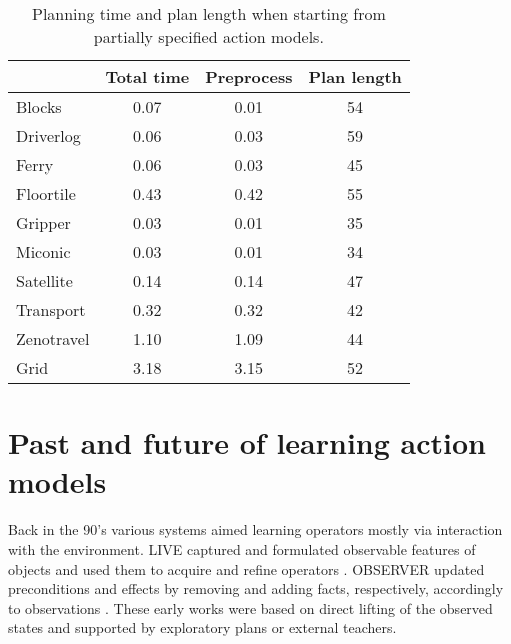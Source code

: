 \documentclass[letterpaper]{article} %
\newcommand{\strips}{\textsc{Strips}}     %
\begin{document}
\begin{table}
\begin{footnotesize}
	\begin{center}
		\begin{tabular}{l|c|c|c|}			
			 & Total time & Preprocess & Plan length  \\
			\hline
			Blocks & 0.07 & 0.01 & 54  \\
			Driverlog & 0.06 & 0.03 & 59 \\
			Ferry & 0.06 & 0.03 & 45 \\
			Floortile & 0.43 & 0.42 & 55 \\
			Gripper & 0.03 & 0.01 & 35 \\
			Miconic & 0.03 & 0.01 & 34  \\
			Satellite & 0.14 & 0.14 & 47 \\
			Transport & 0.32 & 0.32 & 42 \\
			Zenotravel & 1.10 & 1.09 & 44 \\
			Grid & 3.18 & 3.15 & 52 \\
		\end{tabular}
	\end{center}
        \end{footnotesize}
	\caption{\small Planning time and plan length when starting from partially specified action models.}
	\label{tab:time_plans_partial}	
\end{table}


\section{Past and future of learning action models}

Back in the 90's various systems aimed learning operators mostly via interaction with the environment. {\sc LIVE} captured and formulated observable features of objects and used them to acquire and refine operators \cite{ShenS89}. {\sc OBSERVER} updated preconditions and effects by removing and adding facts, respectively, accordingly to observations \cite{Wang95learningby}. These early works were based on direct lifting of the observed states and supported by exploratory plans or external teachers.%

\end{document}
